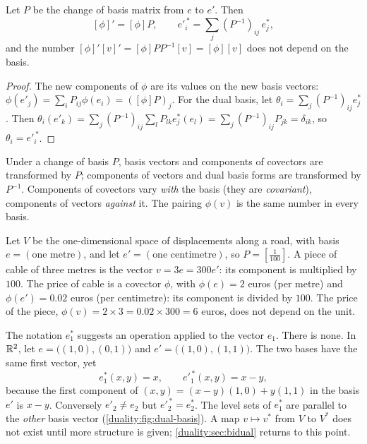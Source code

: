 \begin{notechapter}
\begin{proposition}
\label{duality:prop:covector-change}
Let $P$ be the change of basis matrix from $e$ to $e'$. Then
\[
  [\phi]' = [\phi]P ,
  \qquad
  e'^{\,*}_i = \sum_j(P^{-1})_{ij}\,e_j^* ,
\]
and the number $[\phi]'[v]' = [\phi]PP^{-1}[v] = [\phi][v]$ does not
depend on the basis.
\end{proposition}

\begin{proof}
The new components of $\phi$ are its values on the new basis vectors:
$\phi(e'_j) = \sum_iP_{ij}\phi(e_i) = ([\phi]P)_j$. For the dual basis,
let $\theta_i = \sum_j(P^{-1})_{ij}e_j^*$. Then
$\theta_i(e'_k) = \sum_j(P^{-1})_{ij}\sum_lP_{lk}e_j^*(e_l)
= \sum_j(P^{-1})_{ij}P_{jk} = \delta_{ik}$, so $\theta_i = e'^{\,*}_i$.
\end{proof}

\begin{keyidea}
Under a change of basis $P$, basis vectors and components of covectors are
transformed by $P$; components of vectors and dual basis forms are
transformed by $P^{-1}$. Components of covectors vary \emph{with} the
basis (they are \emph{covariant}), components of vectors \emph{against} it.
The pairing $\phi(v)$ is the same number in every basis.
\end{keyidea}

\begin{example}\label{duality:ex:units}
Let $V$ be the one-dimensional space of displacements along a road, with
basis $e = (\text{one metre})$, and let $e' = (\text{one centimetre})$, so
$P = [\frac1{100}]$. A piece of cable of three metres is the vector
$v = 3e = 300e'$: its component is multiplied by $100$. The price of cable
is a covector $\phi$, with $\phi(e) = 2$ euros (per metre) and
$\phi(e') = 0.02$ euros (per centimetre): its component is divided by
$100$. The price of the piece, $\phi(v) = 2\times3 = 0.02\times300 = 6$
euros, does not depend on the unit.
\end{example}

\begin{pitfall}
The notation $e_1^*$ suggests an operation applied to the vector $e_1$.
There is none. In $\mathbb{R}^2$, let $e = \bigl((1, 0), (0, 1)\bigr)$ and
$e' = \bigl((1, 0), (1, 1)\bigr)$. The two bases have the same first
vector, yet
\[
  e_1^*(x, y) = x , \qquad e'^{\,*}_1(x, y) = x - y ,
\]
because the first component of $(x, y) = (x - y)(1, 0) + y(1, 1)$ in the
basis $e'$ is $x - y$. Conversely $e'_2\neq e_2$ but
$e'^{\,*}_2 = e_2^*$. The level sets of $e_1^*$ are parallel to the
\emph{other} basis vector (\cref{duality:fig:dual-basis}). A map
$v\mapsto v^*$ from $V$ to $V^*$ does not exist until more structure is
given; \cref{duality:sec:bidual} returns to this point.
\end{pitfall}


\end{notechapter}
